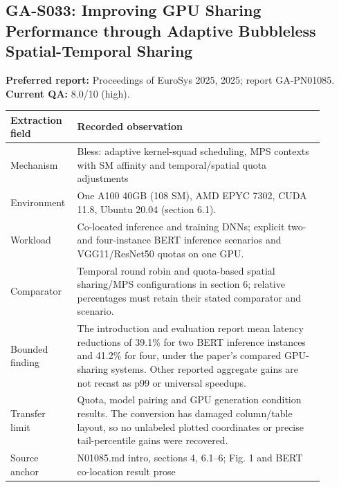 \subsection{GA-S033: Improving GPU Sharing Performance through Adaptive Bubbleless Spatial-Temporal Sharing}
\textbf{Preferred report:} Proceedings of EuroSys 2025, 2025; report GA-PN01085. \textbf{Current QA:} 8.0/10 (high).
\begin{longtable}{P{0.15\linewidth}P{0.75\linewidth}}
\toprule Extraction field & Recorded observation\\\midrule\endhead
Mechanism & Bless: adaptive kernel-squad scheduling, MPS contexts with SM affinity and temporal/spatial quota adjustments\\
Environment & One A100 40GB (108 SM), AMD EPYC 7302, CUDA 11.8, Ubuntu 20.04 (section 6.1).\\
Workload & Co-located inference and training DNNs; explicit two- and four-instance BERT inference scenarios and VGG11/ResNet50 quotas on one GPU.\\
Comparator & Temporal round robin and quota-based spatial sharing/MPS configurations in section 6; relative percentages must retain their stated comparator and scenario.\\
Bounded finding & The introduction and evaluation report mean latency reductions of 39.1\% for two BERT inference instances and 41.2\% for four, under the paper's compared GPU-sharing systems. Other reported aggregate gains are not recast as p99 or universal speedups.\\
Transfer limit & Quota, model pairing and GPU generation condition results. The conversion has damaged column/table layout, so no unlabeled plotted coordinates or precise tail-percentile gains were recovered.\\
Source anchor & N01085.md intro, sections 4, 6.1–6; Fig. 1 and BERT co-location result prose\\
\bottomrule\end{longtable}
